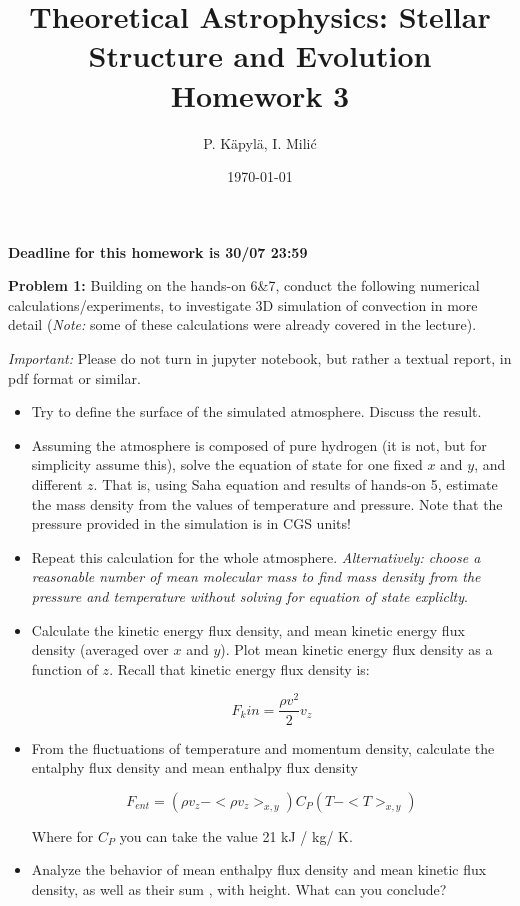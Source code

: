 \documentclass[12pt]{article}
\title{Theoretical Astrophysics: Stellar Structure and Evolution\\
Homework 3}
\author{P. K\"{a}pyl\"{a}, I. Mili\'{c}}
\date{\today}
\begin{document}
\maketitle

\textbf{Deadline for this homework is \textbf{30/07 23:59}}

{\bf Problem 1:} Building on the hands-on 6\&7, conduct the following numerical calculations/experiments, to investigate 3D simulation of convection in more detail (\emph{Note:} some of these calculations were already covered in the lecture).

\emph{Important:} Please do not turn in jupyter notebook, but rather a textual report, in pdf format or similar.  

\begin{itemize}
  \item Try to define the surface of the simulated atmosphere. Discuss the result. 

  \item Assuming the atmosphere is composed of pure hydrogen (it is not, but for simplicity assume this), solve the equation of state for one fixed $x$ and $y$, and different $z$. That is, using Saha equation and results of hands-on 5, estimate the mass density from the values of temperature and pressure. Note that the pressure provided in the simulation is in CGS units!


  \item Repeat this calculation for the whole atmosphere. \emph{Alternatively: choose a reasonable number of mean molecular mass to find mass density from the pressure and temperature without solving for equation of state expliclty}.

  \item Calculate the kinetic energy flux density, and mean kinetic energy flux density (averaged over $x$ and $y$). Plot mean kinetic energy flux density as a function of $z$. Recall that kinetic energy flux density is: 

  \begin{equation}
  F_kin = \frac{\rho v^2}{2} v_z
  \end{equation}

  \item From the fluctuations of temperature and momentum density, calculate the entalphy flux density and mean enthalpy flux density

  \begin{equation}
  F_{ent} = (\rho v_z - <\rho v_z>_{x,y}) C_P (T-<T>_{x,y})
  \end{equation}

  Where for $C_P$ you can take the value 21 kJ / kg/ K.

  \item Analyze the behavior of mean enthalpy flux density and mean kinetic flux density, as well as their sum , with height. What can you conclude? 

\end{itemize}
\end{document}
